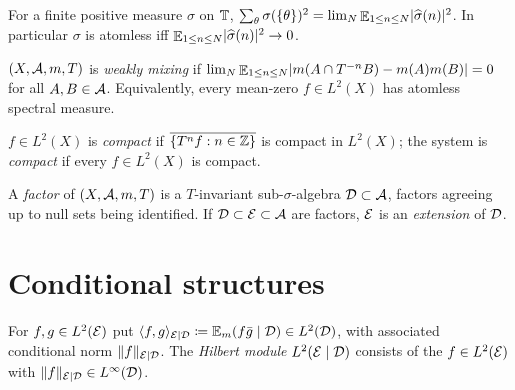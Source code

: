 \begin{lemma}
  \label{lem:wiener}
  \leanok
  For a finite positive measure $\sigma$ on $\mathbb{T}$,
  $\sum_{\theta} \sigma(\{\theta\})^2 = \lim_N \mathop{\mathbb{E}}_{1 \leq n \leq N} \lvert \widehat\sigma(n) \rvert^2$.
  In particular $\sigma$ is atomless iff $\mathop{\mathbb{E}}_{1 \leq n \leq N} \lvert \widehat\sigma(n) \rvert^2 \to 0$.
\end{lemma}

\begin{definition}
  \label{def:weak-mixing}
  \leanok
  $(X,\mathcal{A},m,T)$ is \emph{weakly mixing} if
  $\lim_N \mathop{\mathbb{E}}_{1 \leq n \leq N} \lvert m(A \cap T^{-n}B) - m(A)m(B) \rvert = 0$ for all $A,B \in \mathcal{A}$.
  Equivalently, every mean-zero $f \in L^2(X)$ has atomless spectral measure.
\end{definition}

\begin{definition}
  \label{def:compact-system}
  \leanok
  $f \in L^2(X)$ is \emph{compact} if $\overline{\{T^n f : n \in \mathbb{Z}\}}$ is compact in $L^2(X)$;
  the system is \emph{compact} if every $f \in L^2(X)$ is compact.
\end{definition}

\begin{definition}
  \label{def:factor}
  \leanok
  A \emph{factor} of $(X,\mathcal{A},m,T)$ is a $T$-invariant sub-$\sigma$-algebra $\mathcal{D} \subset \mathcal{A}$,
  factors agreeing up to null sets being identified.  If $\mathcal{D} \subset \mathcal{E} \subset \mathcal{A}$ are
  factors, $\mathcal{E}$ is an \emph{extension} of $\mathcal{D}$.
\end{definition}

\section{Conditional structures}

\begin{definition}
  \label{def:hilbert-module}
  \leanok
  For $f,g \in L^2(\mathcal{E})$ put $\langle f, g \rangle_{\mathcal{E} \mid \mathcal{D}} \coloneqq \mathbb{E}_m(f \bar g \mid \mathcal{D}) \in L^2(\mathcal{D})$,
  with associated conditional norm $\lVert f \rVert_{\mathcal{E} \mid \mathcal{D}}$.  The \emph{Hilbert module}
  $L^2(\mathcal{E} \mid \mathcal{D})$ consists of the $f \in L^2(\mathcal{E})$ with $\lVert f \rVert_{\mathcal{E} \mid \mathcal{D}} \in L^\infty(\mathcal{D})$.
\end{definition}

